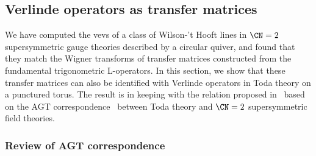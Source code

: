 \begin{comment}
In the case of symmetric powers, we find a discrepancy between this
proposal and the formula~\eqref{eq:vev-T}.  The vev of the 't Hooft
line with $\mcharge = kh^\vee_1$ in $\CN = 2^*$ theory, as computed by
that formula, can be expressed as the Moyal product of $k$ copies of
the vev for the fundamental representation~\cite{Ito:2011ea,
  Hayashi:2019rpw}:
\begin{equation}
  \vev{T_{kh^\vee_1}}
  = \vev{T_{h^\vee_1}} \star \dotsb \star \vev{T_{h^\vee_1}} \,.
\end{equation}
The Moyal product $\star$ has the property that
$\vev{f} \star \vev{g} = \vev{fg}$ with respect to the Wigner
transform, so this equation means that we have
\begin{equation}
  \vev{T_{kh^\vee_1}} = \vev{\CT_m^k} \,.
\end{equation}
However, $\CT_m^k$ is the transfer matrix in the tensor product
representation $(\C^N)^{\otimes k}$, not the $k$th symmetric power of
$\C^N$.  The discrepancy might be ascribed to subtle monopole
contributions to the vev of the 't Hooft line.
\end{comment}








\subsection{Verlinde operators as transfer matrices}
\label{sec:Toda}


We have computed the vevs of a class of Wilson-'t Hooft lines in
$\CN = 2$ supersymmetric gauge theories described by a circular
quiver, and found that they match the Wigner transforms of transfer
matrices constructed from the fundamental trigonometric L-operators.
In this section, we show that these transfer matrices can also be
identified with Verlinde operators in Toda theory on a punctured
torus.  The result is in keeping with the relation proposed
in~\cite{Ito:2011ea} based on the AGT
correspondence~\cite{Alday:2009aq,Wyllard:2009hg} between Toda theory and $\CN = 2$
supersymmetric field theories.






\subsubsection{Review of AGT correspondence}


